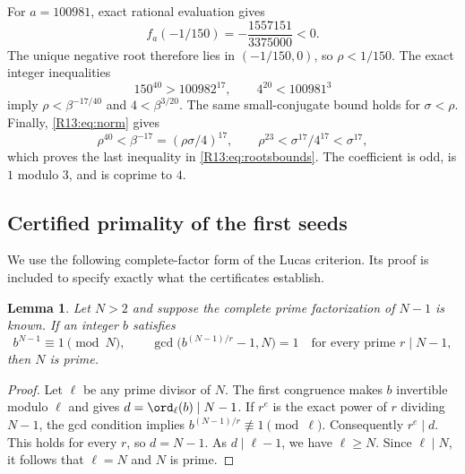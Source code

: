 \documentclass[11pt,a4paper]{article}
\newtheorem{lemma}[theorem]{Lemma}\newtheorem{proposition}[theorem]{Proposition}
\theoremstyle{definition}\newtheorem{definition}[theorem]{Definition}
\theoremstyle{remark}\newtheorem{remark}[theorem]{Remark}
\begin{document}
For $a=100981$, exact rational evaluation gives
\[
 f_a(-1/150)=-\frac{1557151}{3375000}<0.
\]
The unique negative root therefore lies in $(-1/150,0)$, so
$\rho<1/150$. The exact integer inequalities
\begin{equation}\label{R13:eq:integerbounds}
 150^{40}>100982^{17},\qquad 4^{20}<100981^3
\end{equation}
imply $\rho<\beta^{-17/40}$ and $4<\beta^{3/20}$.
The same small-conjugate bound holds for $\sigma<\rho$.
Finally, \eqref{R13:eq:norm} gives
\[
 \rho^{40}<\beta^{-17}=(\rho\sigma/4)^{17},
 \qquad \rho^{23}<\sigma^{17}/4^{17}<\sigma^{17},
\]
which proves the last inequality in \eqref{R13:eq:rootsbounds}.
The coefficient is odd, is $1$ modulo $3$, and is coprime to $4$.

\subsection{Certified primality of the first seeds}

We use the following complete-factor form of the Lucas criterion.
Its proof is included to specify exactly what the certificates establish.

\begin{lemma}\label{R13:lem:lucas}
Let $N>2$ and suppose the complete prime factorization of $N-1$ is
known. If an integer $b$ satisfies
\begin{equation}\label{R13:eq:lucas}
 b^{N-1}\equiv1\pmod N,\qquad
 \gcd\bigl(b^{(N-1)/r}-1,N\bigr)=1
 \quad\text{for every prime }r\mid N-1,
\end{equation}
then $N$ is prime.
\end{lemma}

\begin{proof}
Let $\ell$ be any prime divisor of $N$.
The first congruence makes $b$ invertible modulo $\ell$ and gives
$d=\ord_\ell(b)\mid N-1$.
If $r^e$ is the exact power of $r$ dividing $N-1$, the gcd condition
implies $b^{(N-1)/r}\not\equiv1\pmod\ell$.
Consequently $r^e\mid d$. This holds for every $r$, so $d=N-1$.
As $d\mid\ell-1$, we have $\ell\ge N$.
Since $\ell\mid N$, it follows that $\ell=N$ and $N$ is prime.
\end{proof}
\end{document}
